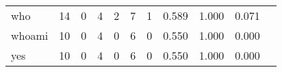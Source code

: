\begin{longtable}{lp{1.2cm}p{1.2cm}p{1.2cm}p{1.2cm}p{1.2cm}p{1.2cm}p{1.2cm}p{1.2cm}p{1.2cm}p{1.2cm}}
who       &                                    14 &                                                  0 &                                                  4 &                                                  2 &                                                  7 &                                                  1 &                                         0.589 &                                              1.000 &                                              0.071 \\
whoami    &                                    10 &                                                  0 &                                                  4 &                                                  0 &                                                  6 &                                                  0 &                                         0.550 &                                              1.000 &                                              0.000 \\
yes       &                                    10 &                                                  0 &                                                  4 &                                                  0 &                                                  6 &                                                  0 &                                         0.550 &                                              1.000 &                                              0.000 \\
\end{longtable}
